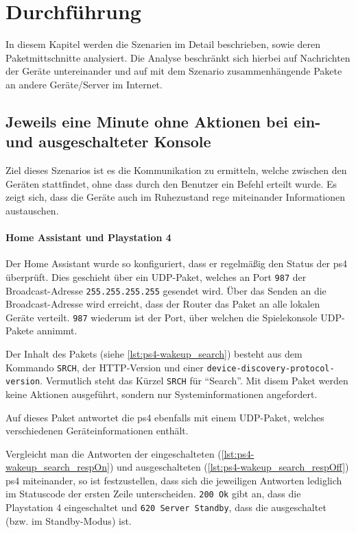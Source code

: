 \newpage
\section{Durchführung}\label{sec:durchfuehrung}
In diesem Kapitel werden die Szenarien im Detail beschrieben,
sowie deren Paketmittschnitte analysiert.
Die Analyse beschränkt sich hierbei auf Nachrichten der Geräte untereinander
und auf mit dem Szenario zusammenhängende Pakete an andere Geräte/Server im Internet.

\subsection{Jeweils eine Minute ohne Aktionen bei ein- und ausgeschalteter Konsole}\label{sec:durchfuehrung-aus}
Ziel dieses Szenarios ist es die Kommunikation zu ermitteln,
welche zwischen den Geräten stattfindet,
ohne dass durch den Benutzer ein Befehl erteilt wurde.
Es zeigt sich, dass die Geräte auch im Ruhezustand rege miteinander Informationen austauschen.

\paragraph{Home Assistant und Playstation 4}
Der Home Assistant wurde so konfiguriert,
dass er regelmäßig den Status der \ac{ps4} überprüft.
Dies geschieht über ein UDP-Paket,
welches an Port \texttt{987} der Broadcast-Adresse \texttt{255.255.255.255} gesendet wird.
Über das Senden an die Broadcast-Adresse wird erreicht,
dass der Router das Paket an alle lokalen Geräte verteilt.
\texttt{987} wiederum ist der Port, über welchen die Spielekonsole UDP-Pakete annimmt.

Der Inhalt des Pakets (siehe \autoref{lst:ps4-wakeup_search}) besteht aus dem Kommando \texttt{SRCH},
der HTTP-Version und einer \texttt{device-discovery-protocol-version}.
Vermutlich steht das Kürzel \texttt{SRCH} für \enquote{Search}.
Mit disem Paket werden keine Aktionen ausgeführt,
sondern nur Systeminformationen angefordert.



\newpage

Auf dieses Paket antwortet die \ac{ps4} ebenfalls mit einem UDP-Paket,
welches verschiedenen Geräteinformationen enthält.

Vergleicht man die Antworten der eingeschalteten (\autoref{lst:ps4-wakeup_search_respOn})
und ausgeschalteten (\autoref{lst:ps4-wakeup_search_respOff}) \ac{ps4} miteinander,
so ist festzustellen,
dass sich die jeweiligen Antworten lediglich im Statuscode der ersten Zeile unterscheiden.
\texttt{200 Ok} gibt an, dass die Playstation 4 eingeschaltet und \texttt{620 Server Standby},
dass die ausgeschaltet (bzw. im Standby-Modus) ist.

